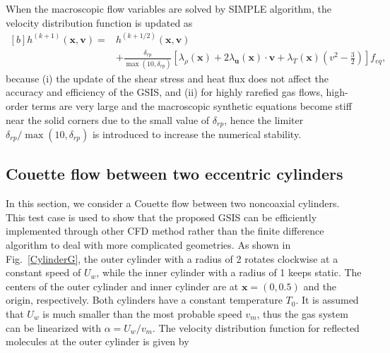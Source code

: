When the macroscopic flow variables are solved by SIMPLE algorithm, the velocity distribution function is updated as
\begin{equation}
\begin{aligned}[b]
h^{(k+1)}(\bm{x},\bm{v})=&h^{(k+1/2)}(\bm{x},\bm{v})\\
&+\frac{\delta_{rp}}{\max(10,\delta_{rp})}\left[\lambda_{\rho}(\bm{x})
+2\lambda_{\bm{u}}(\bm{x})\cdot{\bm{v}}
+\lambda_T(\bm{x})\left(v^2-\frac{3}{2}\right)
\right]f_{eq},
\end{aligned}
\end{equation}
because (i) the update of the shear stress and heat flux does not affect the accuracy and efficiency of the GSIS, and (ii) for highly rarefied gas flows, high-order terms are very large and the macroscopic synthetic equations become stiff near the solid corners due to the small value of $\delta_{rp}$, hence the limiter ${\delta_{rp}}/{\max(10,\delta_{rp})}$ is introduced to increase the numerical stability.






\subsection{Couette flow between two eccentric cylinders}



In this section, we consider a Couette flow between two noncoaxial cylinders. This test case is used to show that the proposed GSIS can be efficiently implemented through other CFD method rather than the finite difference algorithm to deal with more complicated geometries. As shown in Fig.~\ref{CylinderG}, the outer cylinder with a radius of 2 rotates clockwise at a constant speed of $U_w$, while the inner cylinder with a radius of 1 keeps static. The centers of the outer cylinder and inner cylinder are at $\bm{x}=(0,0.5)$ and the origin, respectively. Both cylinders have a constant temperature $T_0$. It is assumed that $U_w$ is much smaller than the most probable speed $v_m$, thus the gas system can be linearized with $\alpha=U_w/v_m$. The velocity distribution function for  reflected molecules at the outer cylinder is given by

